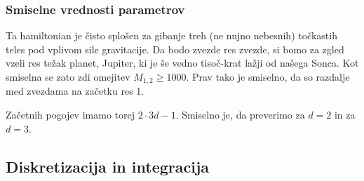 \documentclass[12pt, a4paper]{article}
\begin{document}
\subsubsection{Smiselne vrednosti parametrov}
Ta hamiltonian je \v cisto splo\v sen za gibanje treh (ne nujno nebesnih) to\v ckastih teles pod vplivom sile
gravitacije. Da bodo zvezde res zvezde, si bomo za zgled vzeli res te\v zak planet, Jupiter, ki je \v se
vedno tiso\v c-krat la\v zji od na\v sega Sonca. Kot smiselna se zato zdi omejitev $M_{1,2} \geq 1000$.
Prav tako je smiselno, da so razdalje med zvezdama na za\v cetku res 1.

Za\v cetnih pogojev imamo torej $2 \cdot 3d - 1$. Smiselno je, da preverimo za $d = 2$ in za $d = 3$.

\subsection{Diskretizacija in integracija}
\end{document}
